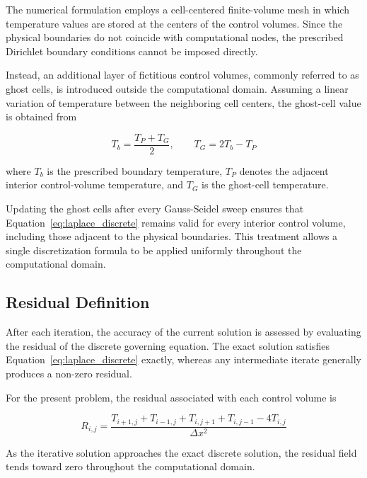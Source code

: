The numerical formulation employs a cell-centered finite-volume mesh in which temperature values are stored at the centers of the control volumes. Since the physical boundaries do not coincide with computational nodes, the prescribed Dirichlet boundary conditions cannot be imposed directly.

Instead, an additional layer of fictitious control volumes, commonly referred to as ghost cells, is introduced outside the computational domain. Assuming a linear variation of temperature between the neighboring cell centers, the ghost-cell value is obtained from

\begin{equation}
T_b
=
\frac{T_P+T_G}{2},
\qquad
T_G
=
2T_b-T_P
\label{eq:ghost}
\end{equation}

where $T_b$ is the prescribed boundary temperature, $T_P$ denotes the adjacent interior control-volume temperature, and $T_G$ is the ghost-cell temperature.

Updating the ghost cells after every Gauss-Seidel sweep ensures that Equation~\ref{eq:laplace_discrete} remains valid for every interior control volume, including those adjacent to the physical boundaries. This treatment allows a single discretization formula to be applied uniformly throughout the computational domain.


\subsection{Residual Definition}

After each iteration, the accuracy of the current solution is assessed by evaluating the residual of the discrete governing equation. The exact solution satisfies Equation~\ref{eq:laplace_discrete} exactly, whereas any intermediate iterate generally produces a non-zero residual.

For the present problem, the residual associated with each control volume is

\begin{equation}
R_{i,j}
=
\frac{
T_{i+1,j}
+
T_{i-1,j}
+
T_{i,j+1}
+
T_{i,j-1}
-
4T_{i,j}
}
{\Delta x^2}
\label{eq:residual}
\end{equation}

As the iterative solution approaches the exact discrete solution, the residual field tends toward zero throughout the computational domain.

